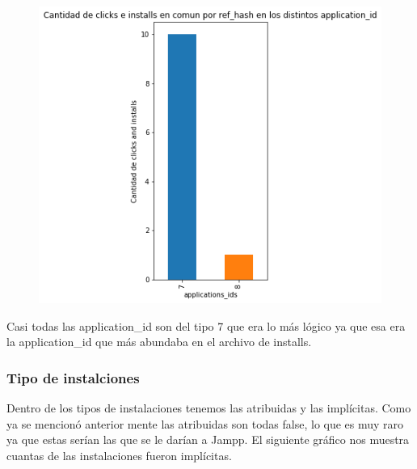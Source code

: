 \documentclass[a4paper, 12pt]{article}
\newcommand\tab[1][1cm]{\hspace*{#1}}
\begin{document}
{{	 \FloatBarrier
		\begin{figure}[h]
			\centering
			\includegraphics[scale = 0.5]{images/clicks-installs/application_id.png}
			\caption{}
		\end{figure}
	\FloatBarrier
	
	\tab Casi todas las application\_id son del tipo 7 que era lo más lógico ya que esa era la application\_id que más abundaba en el archivo de installs.
	
	\subsubsection{Tipo de instalciones}
	\tab Dentro de los tipos de instalaciones tenemos las atribuidas y las implícitas. Como ya se mencionó anterior mente las atribuidas son todas false, lo que es muy raro ya que estas serían las que se le darían a Jampp. 
	\newline
	\newline
	\tab El siguiente gráfico nos muestra cuantas de las instalaciones fueron implícitas.
	
}}
\end{document}
